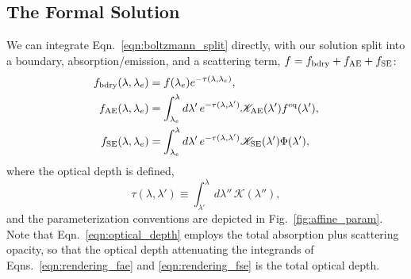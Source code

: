 \documentclass[aps,floatfix,prd,superscriptaddress,twocolumn]{revtex4-1}
\begin{document}
\subsection{The Formal Solution}
\label{ssec:rendering_eqn}
We can integrate Eqn.~\ref{eqn:boltzmann_split} directly, 
with our solution split into a boundary, absorption/emission, and
a scattering term, $f=f_{\rm bdry}+f_{\rm AE}+f_{\rm SE}$:
\begin{align}
  \label{eqn:rendering_fbdry}
  f_{\rm bdry}(\lambda,\lambda_e)
  &= f(\lambda_e) e^{-\tau(\lambda,\lambda_e)}, \\
  \label{eqn:rendering_fae}
  f_{\rm AE}(\lambda,\lambda_e)
  &= \int_{\lambda_e}^\lambda d\lambda'\,e^{-\tau(\lambda,\lambda')}
  \mathscr{K}_{\rm AE}(\lambda')f^{\rm eq}(\lambda'), \\
  \label{eqn:rendering_fse}
  f_{\rm SE}(\lambda,\lambda_e)
  &= \int_{\lambda_e}^\lambda d\lambda'\,e^{-\tau(\lambda,\lambda')}
  \mathscr{K}_{\rm SE}(\lambda')\Phi(\lambda'),
\end{align}
where the optical depth is defined,
\begin{equation}
  \label{eqn:optical_depth}
  \tau(\lambda,\lambda') \equiv \int_{\lambda'}^\lambda
  d\lambda'' \, \mathscr{K}(\lambda''),
\end{equation}
and the parameterization conventions are depicted in
Fig.~\ref{fig:affine_param}.
Note that Eqn.~\ref{eqn:optical_depth} employs the total absorption
plus scattering opacity, so that the optical depth attenuating the
integrands of Eqns.~\ref{eqn:rendering_fae} and \ref{eqn:rendering_fse}
is the total optical depth.

\end{document}
